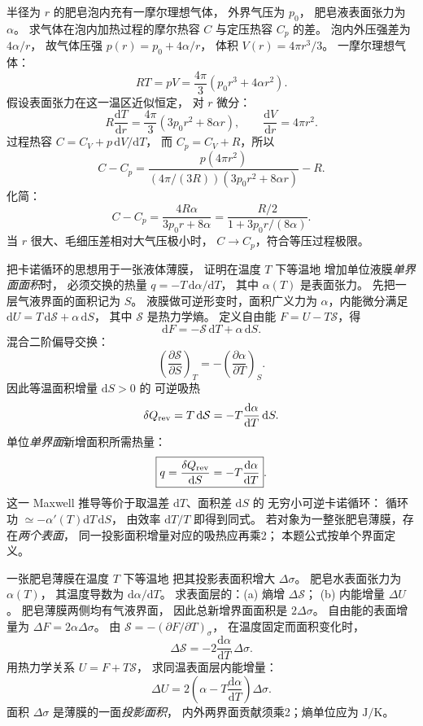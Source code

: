 半径为 $r$ 的肥皂泡内充有一摩尔理想气体，
外界气压为 $p_0$，
肥皂液表面张力为 $\alpha$。
求气体在泡内加热过程的摩尔热容 $C$
与定压热容 $C_p$ 的差。
\exsolution
泡内外压强差为
$4\alpha/r$，
故气体压强
$p(r)=p_0+4\alpha/r$，
体积
$V(r)=4\pi r^3/3$。
一摩尔理想气体：
\[
RT=pV=\frac{4\pi}{3}(p_0r^3+4\alpha r^2).
\]
假设表面张力在这一温区近似恒定，
对 $r$ 微分：
\[
R\frac{\mathrm dT}{\mathrm dr}
=\frac{4\pi}{3}(3p_0r^2+8\alpha r),
\qquad
\frac{\mathrm dV}{\mathrm dr}=4\pi r^2.
\]
过程热容
$C=C_V+p\,\mathrm dV/\mathrm dT$，
而 $C_p=C_V+R$，所以
\[
C-C_p
=\frac{p(4\pi r^2)}
{(4\pi/(3R))(3p_0r^2+8\alpha r)}-R.
\]
化简：
\[
\boxed{C-C_p=
\frac{4R\alpha}{3p_0r+8\alpha}
=\frac{R/2}{1+3p_0r/(8\alpha)}}.
\]
\excheck 当 $r$ 很大、毛细压差相对大气压极小时，
$C\to C_p$，符合等压过程极限。

把卡诺循环的思想用于一张液体薄膜，
证明在温度 $T$ 下等温地
增加单位液膜\emph{单界面面积}时，
必须交换的热量
$q=-T\,\mathrm d\alpha/\mathrm dT$，
其中 $\alpha(T)$ 是表面张力。
\exsolution
先把一层气液界面的面积记为 $S$。
液膜做可逆形变时，面积广义力为
$\alpha$，内能微分满足
$\mathrm dU=T\,\mathrm d\mathcal S+\alpha\,\mathrm dS$，
其中 $\mathcal S$ 是热力学熵。
定义自由能
$F=U-T\mathcal S$，得
\[
\mathrm dF=-\mathcal S\,\mathrm dT+\alpha\,\mathrm dS.
\]
混合二阶偏导交换：
\[
\left(\frac{\partial\mathcal S}{\partial S}\right)_T
=-\left(\frac{\partial\alpha}{\partial T}\right)_S.
\]
因此等温面积增量 $\mathrm dS>0$ 的
可逆吸热
\[
\delta Q_{\rm rev}=T\,\mathrm d\mathcal S
=-T\frac{\mathrm d\alpha}{\mathrm dT}\,\mathrm dS.
\]
单位\emph{单界面}新增面积所需热量：
\[
\boxed{q=\frac{\delta Q_{\rm rev}}{\mathrm dS}
=-T\frac{\mathrm d\alpha}{\mathrm dT}}.
\]
这一 Maxwell 推导等价于取温差
$\mathrm dT$、面积差 $\mathrm dS$ 的
无穷小可逆卡诺循环：
循环功 $\simeq-\alpha'(T)\mathrm dT\,\mathrm dS$，
由效率 $\mathrm dT/T$ 即得到同式。
\excheck 若对象为一整张肥皂薄膜，存在\emph{两个表面}，
同一投影面积增量对应的吸热应再乘2；
本题公式按单个界面定义。

一张肥皂薄膜在温度 $T$ 下等温地
把其投影表面积增大 $\Delta\sigma$。
肥皂水表面张力为 $\alpha(T)$，
其温度导数为 $\mathrm d\alpha/\mathrm dT$。
求表面层的：(a) 熵增 $\Delta\mathcal S$；
(b) 内能增量 $\Delta U$。
\exsolution
肥皂薄膜两侧均有气液界面，
因此总新增界面面积是 $2\Delta\sigma$。
自由能的表面增量为
$\Delta F=2\alpha\Delta\sigma$。
由
$\mathcal S=-(\partial F/\partial T)_\sigma$，
在温度固定而面积变化时，
\[
\boxed{\Delta\mathcal S
=-2\frac{\mathrm d\alpha}{\mathrm dT}
\,\Delta\sigma}.
\]
用热力学关系
$U=F+T\mathcal S$，
求同温表面层内能增量：
\[
\boxed{\Delta U
=2\left(\alpha-
T\frac{\mathrm d\alpha}{\mathrm dT}\right)
\Delta\sigma}.
\]
\excheck 面积 $\Delta\sigma$ 是薄膜的一面\emph{投影面积}，
内外两界面贡献须乘2；熵单位应为 $\mathrm{J/K}$。

